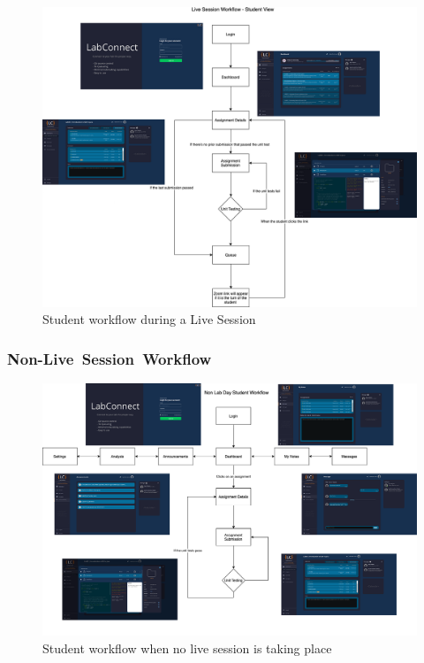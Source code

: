 \documentclass[a4paper, 12pt]{article}
\begin{document}
    \begin{figure}[H]
      \centering
      \includegraphics[width=\textwidth]{map_live-session-student}
      \caption{Student workflow during a Live Session}\label{fig:map_live_student}
    \end{figure}

    \pagebreak

    \subsubsection{Non-Live~Session~Workflow}

    \begin{figure}[H]
      \centering
      \includegraphics[width=\textwidth]{map_student}
      \caption{Student workflow when no live session is taking place}\label{fig:map_student}
    \end{figure}
\end{document}
